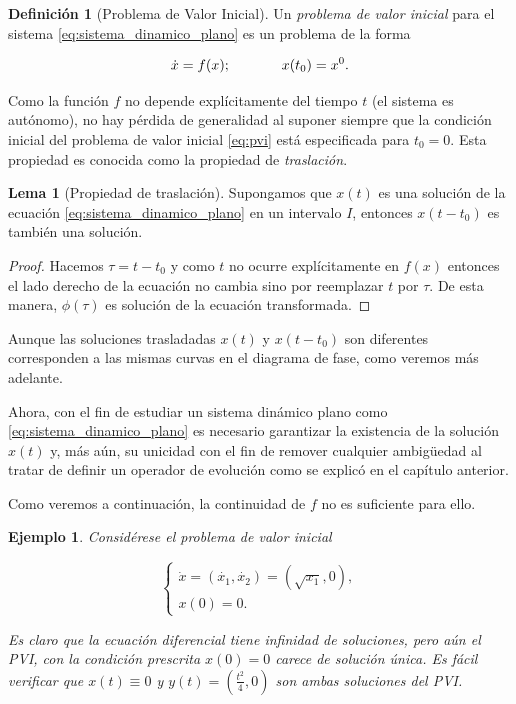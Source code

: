 \documentclass[11pt]{book}
\theoremstyle{definition}
\newtheorem{definition}{Definición}
\numberwithin{definition}{section}
\theoremstyle{theorem}
\newtheorem{lemma}{Lema}
\numberwithin{theorem}{section}
\numberwithin{lemma}{section}
\numberwithin{corollary}{section}
\theoremstyle{plain}
\newtheorem{example}{Ejemplo}
\numberwithin{example}{section}
\begin{document}
\begin{definition}[Problema de Valor Inicial]\label{def:pvi}
Un \emph{problema de valor inicial} para el sistema \ref{eq:sistema_dinamico_plano} es un problema de la forma

\begin{equation} \label{eq:pvi}
 \dot{x} = f(x); \hspace{0.5in} x(t_0) = x^0.
\end{equation}

\end{definition}

Como la función $f$ no depende explícitamente del tiempo $t$ (el sistema es autónomo), no hay pérdida de generalidad al suponer siempre que la condición inicial del problema de valor inicial \ref{eq:pvi} está especificada para $t_0 = 0$. Esta propiedad es conocida como la propiedad de \emph{traslación}.

\begin{lemma}[Propiedad de traslación] Supongamos que $x(t)$ es una solución de la ecuación \ref{eq:sistema_dinamico_plano} en un intervalo $I$, entonces $x(t-t_0)$ es también una solución.
\begin{proof}Hacemos $\tau = t - t_0$ y como $t$ no ocurre explícitamente en $f(x)$ entonces el lado derecho de la ecuación no cambia sino por reemplazar $t$ por $\tau$. De esta manera, $\phi(\tau)$ es solución de la ecuación transformada.
\end{proof}
\end{lemma}

Aunque las soluciones trasladadas $x(t)$ y $x(t-t_0)$ son diferentes corresponden a las mismas curvas en el diagrama de fase, como veremos más adelante.

Ahora, con el fin de estudiar un sistema dinámico plano como \ref{eq:sistema_dinamico_plano} es necesario garantizar la existencia de la solución $x(t)$ y, más aún, su unicidad con el fin de remover cualquier ambigüedad al tratar de definir un operador de evolución como se explicó en el capítulo anterior.

Como veremos a continuación, la continuidad de $f$ no es suficiente para ello.

\begin{example}Considérese el problema de valor inicial
    
$$
\left\{
    \begin{array}{l}
        \dot{x} = (\dot{x_1}, \dot{x_2}) = (\sqrt{x_1}, 0), \\
        x(0) = 0.
    \end{array}
\right.
$$

Es claro que la ecuación diferencial tiene infinidad de soluciones, pero aún el PVI, con la condición prescrita $x(0) = 0$ carece de solución única. Es fácil verificar que $x(t) \equiv 0$ y $y(t) = (\frac{t^2}{4}, 0) $ son ambas soluciones del PVI.
\end{example}
\end{document}
